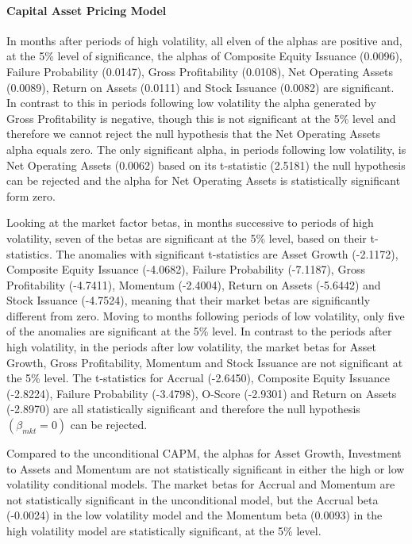 \documentclass[12pt, a4paper, oneside]{article}
\begin{document}
\paragraph{Capital Asset Pricing Model}
In months after periods of high volatility, all elven of the alphas are positive and, at the 5\% level of significance, the alphas of Composite Equity Issuance (0.0096), Failure Probability (0.0147), Gross Profitability (0.0108), Net Operating Assets (0.0089), Return on Assets (0.0111) and Stock Issuance (0.0082) are significant. In contrast to this in periods following low volatility the alpha generated by Gross Profitability is negative, though this is not significant at the 5\% level and therefore we cannot reject the null hypothesis that the Net Operating Assets alpha equals zero. The only significant alpha, in periods following low volatility, is Net Operating Assets (0.0062) based on its t-statistic (2.5181) the null hypothesis can be rejected and the alpha for Net Operating Assets is statistically significant form zero. 

Looking at the market factor betas, in months successive to periods of high volatility, seven of the betas are significant at the 5\% level, based on their t-statistics. The anomalies with significant t-statistics are Asset Growth (-2.1172), Composite Equity Issuance (-4.0682), Failure Probability (-7.1187), Gross Profitability (-4.7411), Momentum (-2.4004), Return on Assets (-5.6442) and Stock Issuance (-4.7524), meaning that their market betas are significantly different from zero. Moving to months following periods of low volatility, only five of the anomalies are significant at the 5\% level. In contrast to the periods after high volatility, in the periods after low volatility, the market betas for Asset Growth, Gross Profitability, Momentum and Stock Issuance are not significant at the 5\% level. The t-statistics for Accrual (-2.6450), Composite Equity Issuance (-2.8224), Failure Probability (-3.4798), O-Score (-2.9301) and Return on Assets (-2.8970) are all statistically significant and therefore the null hypothesis $(\beta_{mkt}= 0)$ can be rejected.

Compared to the unconditional CAPM, the alphas for Asset Growth, Investment to Assets and Momentum are not statistically significant in either the high or low volatility conditional models. The market betas for Accrual and Momentum are not statistically significant in the unconditional model, but the Accrual beta (-0.0024) in the low volatility model and the Momentum beta (0.0093) in the high volatility model are statistically significant, at the 5\% level. 
\end{document}
